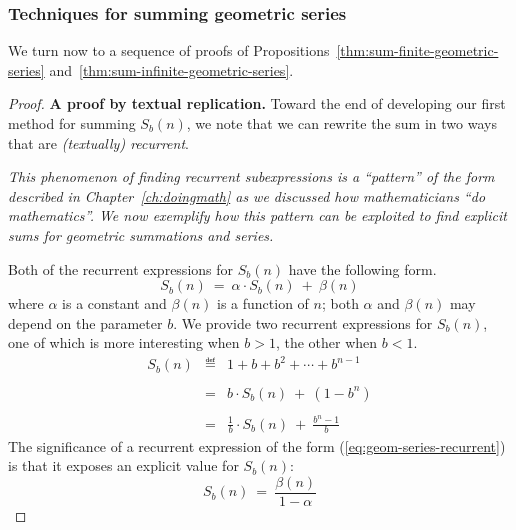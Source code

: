 \subsubsection{Techniques for summing geometric series}
\label{sec:summing-geometric-series:techniques}

We turn now to a sequence of proofs of
Propositions~\ref{thm:sum-finite-geometric-series}
and~\ref{thm:sum-infinite-geometric-series}.

\medskip

\begin{proof}
{\bf A proof by textual replication.}
%
Toward the end of developing our first method for summing $S_{b}(n)$,
we note that we can rewrite the sum in two ways that are {\em
  (textually) recurrent}.

\bigskip

\noindent
{\em This phenomenon of {\em finding recurrent subexpressions} is a
  ``pattern'' of the form described in Chapter~\ref{ch:doingmath} as
  we discussed how mathematicians ``do mathematics''.  We now
  exemplify how this pattern can be exploited to find explicit sums
  for geometric summations and series.}

\bigskip

\noindent
Both of the recurrent expressions for $S_{b}(n)$ have the following form.
\begin{equation}
\label{eq:geom-series-recurrent}
S_b(n) \ = \ \alpha \cdot S_b(n) \ + \ \beta(n)
\end{equation}
where $\alpha$ is a constant and $\beta(n)$ is a function of $n$; both
$\alpha$ and $\beta(n)$ may depend on the parameter $b$.  We provide
two recurrent expressions for $S_b(n)$, one of which is more
interesting when $b>1$, the other when $b<1$.
\begin{eqnarray}
\label{eq:geom-series-replicate}
\nonumber
S_{b}(n) 
  & \eqdef &
1+ b + b^2 + \cdots + b^{n-1}  \\
\nonumber
  &   &  \\
\label{eq:geom-series-replicate-1}
   & = & b \cdot S_{b}(n) \ + \ (1 - b^n) \\
\nonumber
   &  & \\
\label{eq:geom-series-replicate-2}
  & = &
\frac{1}{b} \cdot S_{b}(n) \ + \ \frac{b^n -1}{b} 
\end{eqnarray}
The significance of a recurrent expression of the form
(\ref{eq:geom-series-recurrent}) is that it exposes an explicit value
for $S_b(n)$:
\begin{equation}
\label{eq:geom-series-generic}
S_b(n) \ = \ \frac{\beta(n)}{1 - \alpha}
\end{equation}


\end{proof}
